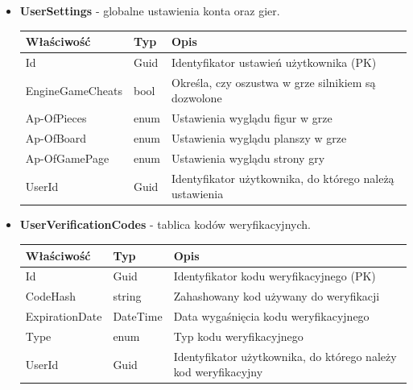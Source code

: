 \documentclass[12pt,a4paper]{article}
\begin{document}
\begin{itemize}
    \item \textbf{UserSettings} - globalne ustawienia konta oraz gier.
    \begin{longtable}{|m{4cm}|m{2cm}|m{8cm}|}
        \hline
        \textbf{Właściwość} & \textbf{Typ} & \textbf{Opis} \\ \hline
        \endhead
        \hline
        Id & Guid & Identyfikator ustawień użytkownika (PK) \\ \hline
        EngineGameCheats & bool & Określa, czy oszustwa w grze silnikiem są dozwolone \\ \hline
        Ap-OfPieces & enum & Ustawienia wyglądu figur w grze \\ \hline
        Ap-OfBoard & enum & Ustawienia wyglądu planszy w grze \\ \hline
        Ap-OfGamePage & enum & Ustawienia wyglądu strony gry \\ \hline
        UserId & Guid & Identyfikator użytkownika, do którego należą ustawienia \\ \hline
    \end{longtable}

    \item \textbf{UserVerificationCodes} - tablica kodów weryfikacyjnych.
    \begin{longtable}{|m{4cm}|m{2cm}|m{8cm}|}
        \hline
        \textbf{Właściwość} & \textbf{Typ} & \textbf{Opis} \\ \hline
        \endhead
        \hline
        Id & Guid & Identyfikator kodu weryfikacyjnego (PK) \\ \hline
        CodeHash & string & Zahashowany kod używany do weryfikacji \\ \hline
        ExpirationDate & DateTime & Data wygaśnięcia kodu weryfikacyjnego \\ \hline
        Type & enum & Typ kodu weryfikacyjnego \\ \hline
        UserId & Guid & Identyfikator użytkownika, do którego należy kod weryfikacyjny \\ \hline
    \end{longtable}


\end{itemize}
\end{document}
